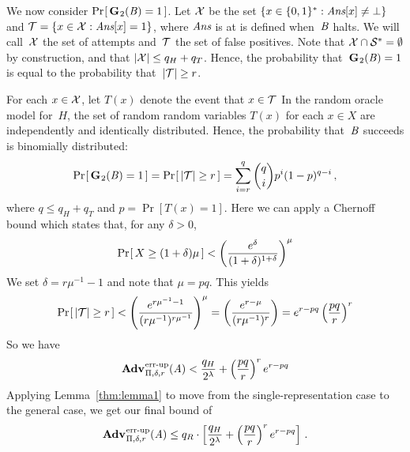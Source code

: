 We now consider $\Pr\hspace{-1pt}\left[\,\textup{\textbf{G}}\hspace{0.5pt}_2(\mathit{B})=1\,\right]$.
%
Let $\mathcal{X}$ be the set $\{ x \in \{0,1\}^* : \textit{Ans}[x] \ne \bot \}$ and $\mathcal{T} = \{x
\in\mathcal{X}: \textit{Ans}[x] = 1\}$, where $\textit{Ans}$ is at is defined when~$\mathit{B}$ halts. We
will call~$\mathcal{X}$ the set of attempts and~$\mathcal{T}$ the set of false positives.
%
Note that $\mathcal{X}\cap\mathcal{S}^*=\emptyset$ by construction, and that
$|\mathcal{X}| \leq q_H + q_T$.
%
Hence, the probability that~$\textup{\textbf{G}}\hspace{0.5pt}_2(\mathit{B})=1$ is equal to the probability
that~$|\mathcal{T}| \geq r$.

For each $x\in\mathcal{X}$, let $T(x)$ denote the event that $x\in\mathcal{T}$
%
In the random oracle model for~$H$, the set of random random variables $T(x)$
for each $x\in X$ are independently and identically distributed.
%
Hence, the probability that~$\mathit{B}$ succeeds is binomially distributed:
%
\begin{equation}
   \Pr\hspace{-1pt}\left[\,\textup{\textbf{G}}\hspace{0.5pt}_2(\mathit{B})=1\,\right] = \Pr\hspace{-1pt}\left[\, |\mathcal{T}| \geq r \,\right] =
     \sum_{i=r}^{q} \binom{q}{i}p^i(1-p)^{q-i} \,,
\end{equation}
%
where $q \leq q_H + q_T$ and $p = \Pr[T(x)=1]$. Here we can apply a Chernoff
bound which states that, for any $\delta > 0$,
%
\begin{equation}
  \Pr\hspace{-1pt}\left[\,X \geq (1+\delta)\mu\,\right] < \left(\frac{e^\delta}{(1+\delta)^{1+\delta}}\right)^\mu
\end{equation}
%
We set $\delta = r\mu^{-1}-1$ and note that $\mu = pq$.
This yields
%
\begin{equation}
 \Pr\hspace{-1pt}\left[\,|\mathcal{T}| \geq r\,\right] < \left(\frac{e^{r\mu^{-1}-1}}{(r\mu^{-1})^{r\mu^{-1}}}\right)^\mu = \left(\frac{e^{r-\mu}}{(r\mu^{-1})^r}\right) = e^{r-pq}\left(\frac{pq}{r}\right)^r
\end{equation}
%
So we have
%
\begin{equation}
  \Adv{\errep}_{\Pi,\delta,r}(\advA) < \frac{q_H}{2^\lambda} + \left(\frac{pq}{r}\right)^re^{r-pq}
\end{equation}
%
Applying Lemma~\ref{thm:lemma1} to move from the single-representation case to the
general case, we get our final bound of
\begin{equation}
  \Adv{\errep}_{\Pi,\delta,r}(\advA) \leq
    q_R \cdot \left[
      \frac{q_H}{2^\lambda} +
      \left(\frac{pq}{r}\right)^re^{r-pq}
    \right] \,.
\end{equation}